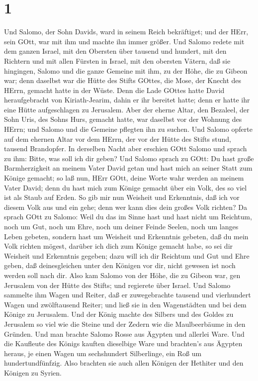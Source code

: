 \hypertarget{section}{%
\section{1}\label{section}}

 Und Salomo, der Sohn Davids, ward in seinem Reich
bekräftiget; und der HErr, sein GOtt, war mit ihm und machte ihn immer
größer.  Und Salomo redete mit dem ganzen Israel, mit den
Obersten über tausend und hundert, mit den Richtern und mit allen
Fürsten in Israel, mit den obersten Vätern,  daß sie
hingingen, Salomo und die ganze Gemeine mit ihm, zu der Höhe, die zu
Gibeon war; denn daselbst war die Hütte des Stifts GOttes, die Mose, der
Knecht des HErrn, gemacht hatte in der Wüste.  Denn die Lade
GOttes hatte David heraufgebracht von Kiriath-Jearim, dahin er ihr
bereitet hatte; denn er hatte ihr eine Hütte aufgeschlagen zu Jerusalem.
 Aber der eherne Altar, den Bezaleel, der Sohn Uris, des
Sohns Hurs, gemacht hatte, war daselbst vor der Wohnung des HErrn; und
Salomo und die Gemeine pflegten ihn zu suchen.  Und Salomo
opferte auf dem ehernen Altar vor dem HErrn, der vor der Hütte des
Stifts stund, tausend Brandopfer.  In derselben Nacht aber
erschien GOtt Salomo und sprach zu ihm: Bitte, was soll ich dir geben?
 Und Salomo sprach zu GOtt: Du hast große Barmherzigkeit an
meinem Vater David getan und hast mich an seiner Statt zum Könige
gemacht;  so laß nun, HErr GOtt, deine Worte wahr werden an
meinem Vater David; denn du hast mich zum Könige gemacht über ein Volk,
des so viel ist als Staub auf Erden.  So gib mir nun
Weisheit und Erkenntnis, daß ich vor diesem Volk aus und ein gehe; denn
wer kann dies dein großes Volk richten?  Da sprach GOtt zu
Salomo: Weil du das im Sinne hast und hast nicht um Reichtum, noch um
Gut, noch um Ehre, noch um deiner Feinde Seelen, noch um langes Leben
gebeten, sondern hast um Weisheit und Erkenntnis gebeten, daß du mein
Volk richten mögest, darüber ich dich zum Könige gemacht habe,
 so sei dir Weisheit und Erkenntnis gegeben; dazu will ich
dir Reichtum und Gut und Ehre geben, daß deinesgleichen unter den
Königen vor dir, nicht gewesen ist noch werden soll nach dir.
 Also kam Salomo von der Höhe, die zu Gibeon war, gen
Jerusalem von der Hütte des Stifts; und regierete über Israel.
 Und Salomo sammelte ihm Wagen und Reiter, daß er
zuwegebrachte tausend und vierhundert Wagen und zwölftausend Reiter; und
ließ sie in den Wagenstädten und bei dem Könige zu Jerusalem.
 Und der König machte des Silbers und des Goldes zu
Jerusalem so viel wie die Steine und der Zedern wie die Maulbeerbäume in
den Gründen.  Und man brachte Salomo Rosse aus Ägypten und
allerlei Ware. Und die Kaufleute des Königs kauften dieselbige Ware
 und brachten's aus Ägypten heraus, je einen Wagen um
sechshundert Silberlinge, ein Roß um hundertundfünfzig. Also brachten
sie auch allen Königen der Hethiter und den Königen zu Syrien.

